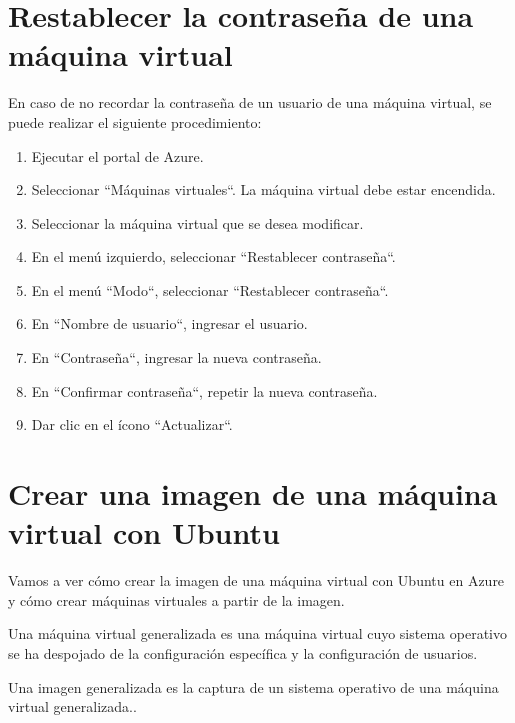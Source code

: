 \documentclass[11pt,a4paper,oneside]{book}
\begin{document}
\section{Restablecer la contraseña de una máquina virtual}

En caso de no recordar la contraseña de un usuario de una máquina virtual, se puede realizar el siguiente procedimiento:

\begin{enumerate}

\item Ejecutar el portal de Azure.

\item Seleccionar ``Máquinas virtuales``. La máquina virtual debe estar encendida.

\item Seleccionar la máquina virtual que se desea modificar.

\item En el menú izquierdo, seleccionar ``Restablecer contraseña``.

\item En el menú ``Modo``, seleccionar ``Restablecer contraseña``.

\item En ``Nombre de usuario``, ingresar el usuario.

\item En ``Contraseña``, ingresar la nueva contraseña.

\item En ``Confirmar contraseña``, repetir la nueva contraseña.

\item Dar clic en el ícono ``Actualizar``.

\end{enumerate}

\section{Crear una imagen de una máquina virtual con Ubuntu}

Vamos a ver cómo crear la imagen de una máquina virtual con Ubuntu en Azure y cómo crear máquinas virtuales a partir de la imagen.

Una máquina virtual generalizada es una máquina virtual cuyo sistema operativo se ha despojado de la configuración específica y la configuración de usuarios.

Una imagen generalizada es la captura de un sistema operativo de una máquina virtual generalizada..
\end{document}
